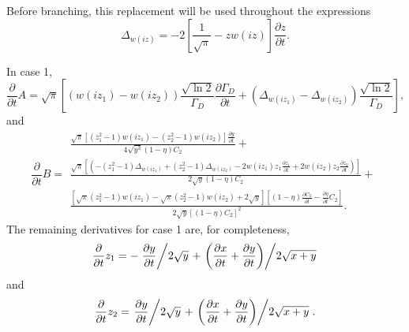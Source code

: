 Before branching, this replacement will be used throughout the expressions
\begin{equation}
 \Delta_{w(iz)} = -2 \left[\frac{1}{\sqrt{\pi}} - z w(iz)\right] \frac{\partial z}{\partial t}.
\end{equation}

In case 1,
\begin{equation}
 \frac{\partial}{\partial t} A = \sqrt{\pi} \left[\left(w(iz_1) - w(iz_2)\right) \frac{\sqrt{\ln 2}}{\Gamma_D}\frac{\partial \Gamma_D}{\partial t} + \left(\Delta_{w(iz_1)} - \Delta_{w(iz_2)}\right) \frac{\sqrt{\ln 2}}{\Gamma_D}\right],
\end{equation}
and
\begin{equation}
\frac{\partial}{\partial t} B =
\begin{array}{l}
 \frac{\sqrt{\pi} \left[\left(z_1^2 - 1\right) w(iz_1) - \left(z_2^2 - 1\right) w(iz_2)\right] \frac{\partial y }{\partial t}}{4 \sqrt{y^3} (1-\eta)C_2} + \\[5pt]  
 \frac{\sqrt{\pi} \left[
 \left(-\left(z_1^2 - 1\right) \Delta_{w(iz_1)} + \left(z_2^2 - 1\right) \Delta_{w(iz_2)} -
 2 w(iz_1) z_1 \frac{\partial z_1}{\partial t} + 2 w(iz_2) z_2 \frac{\partial z_2}{\partial t}\right)  \right] }{2 \sqrt{y} (1-\eta)C_2} + \\[5pt]
  \frac{\left[\sqrt{\pi} (z_1^2 - 1) w(iz_1) -
  \sqrt{\pi} (z_2^2 - 1) w(iz_2) + 2 \sqrt{y}\right]
  \left[(1-\eta)\frac{\partial C_2}{\partial t} - \frac{\partial\eta}{\partial t}C_2\right] }
  {2 \sqrt{y} \left[(1-\eta)C_2\right]^2}.
\end{array} 
\end{equation}
The remaining derivatives for case 1 are, for completeness,
\begin{equation}
\frac{\partial}{\partial t} z_1 = -\left.\frac{\partial y}{\partial t} \middle/ 2\sqrt{y}\right. + \left.\left(\frac{\partial x}{\partial t} + \frac{\partial y}{\partial t}\right) \middle/ 2 \sqrt{x+y} \right.
\end{equation}
and 
\begin{equation}
\frac{\partial}{\partial t} z_2 = \left.\frac{\partial y}{\partial t} \middle/ 2\sqrt{y}\right. + \left.\left(\frac{\partial x}{\partial t} + \frac{\partial y}{\partial t}\right) \middle/ 2 \sqrt{x+y} \right..
\end{equation}

